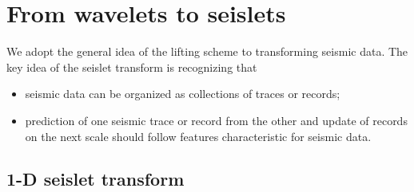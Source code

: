 


%
%
%

%
%

\section{From wavelets to seislets}

We adopt the general idea of the lifting scheme to transforming
seismic data. The key idea of the seislet transform \cite[]{seislet}
is recognizing that
\begin{itemize}
\item seismic data can be organized as collections of traces or
  records;
\item prediction of one seismic trace or record from the other and
  update of records on the next scale should follow features
  characteristic for seismic data.
\end{itemize}

\subsection{1-D seislet transform}


